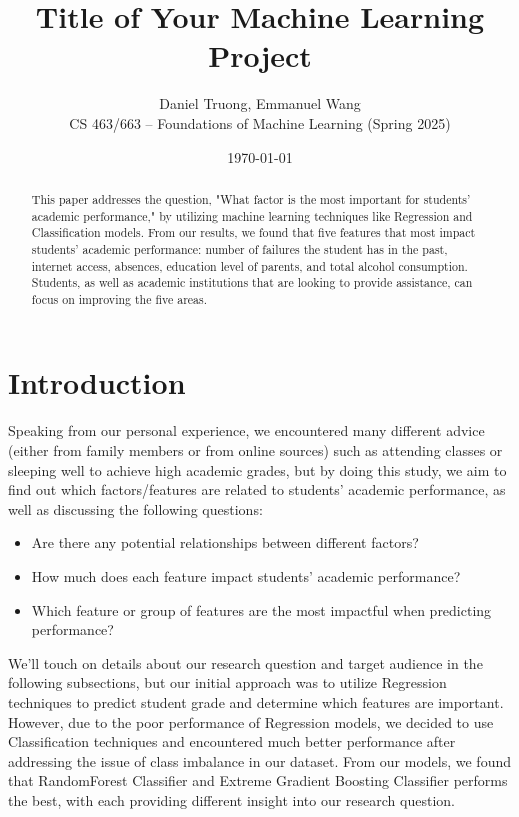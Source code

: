 \documentclass[11pt,a4paper]{article}
\title{\Large \textbf{Title of Your Machine Learning Project}}
\author{Daniel Truong, Emmanuel Wang \\ CS 463/663 – Foundations of Machine Learning (Spring 2025)}
\date{\today}
\begin{document}
\maketitle

\begin{abstract}
This paper addresses the question, "What factor is the most important for students' academic performance," by utilizing machine learning techniques like Regression and Classification models. From our results, we found that five features that most impact students' academic performance: number of failures the student has in the past, internet access, absences, education level of parents, and total alcohol consumption. Students, as well as academic institutions that are looking to provide assistance, can focus on improving the five areas.
\end{abstract}

\tableofcontents
\newpage

\section{Introduction}
Speaking from our personal experience, we encountered many different advice (either from family members or from online sources) such as attending classes or sleeping well to achieve high academic grades, but  by doing this study, we aim to find out which factors/features are related to students’ academic performance, as well as discussing the following questions:
\begin{itemize}
    \item Are there any potential relationships between different factors?
    \item How much does each feature impact students' academic performance?
    \item Which feature or group of features are the most impactful when predicting performance?
\end{itemize}
We'll touch on details about our research question and target audience in the following subsections, but our initial approach was to utilize Regression techniques to predict student grade and determine which features are important. However, due to the poor performance of Regression models, we decided to use Classification techniques and encountered much better performance after addressing the issue of class imbalance in our dataset. From our models, we found that RandomForest Classifier and Extreme Gradient Boosting Classifier performs the best, with each providing different insight into our research question.
\end{document}
